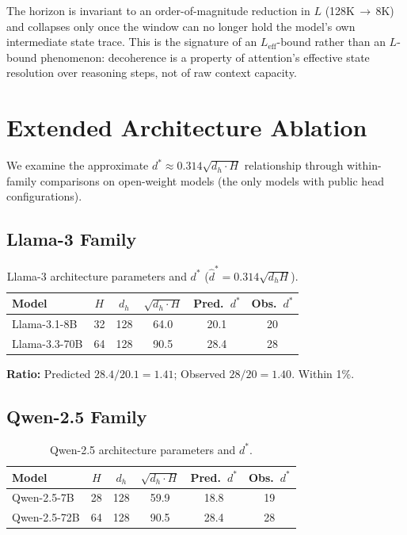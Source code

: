 \documentclass{article}
\theoremstyle{plain}
\theoremstyle{definition}
\theoremstyle{remark}
\newcommand{\Leff}{L_{\mathrm{eff}}}
\begin{document}
The horizon is invariant to an order-of-magnitude reduction in $L$ (128K\,$\to$\,8K) and collapses only once the window can no longer hold the model's own intermediate state trace. This is the signature of an $\Leff$-bound rather than an $L$-bound phenomenon: decoherence is a property of attention's effective state resolution over reasoning steps, not of raw context capacity.


\section{Extended Architecture Ablation}
\label{app:arch_ablation}

We examine the approximate $d^* \approx 0.314\sqrt{d_h \cdot H}$ relationship through within-family comparisons on open-weight models (the only models with public head configurations).

\subsection{Llama-3 Family}

\begin{table}[h]
\centering
\caption{Llama-3 architecture parameters and $d^*$ ($\hat{d}^* = 0.314\sqrt{d_h H}$).}
\label{tab:llama_arch}
\small
\begin{tabular}{@{}lccccc@{}}
\toprule
\textbf{Model} & $H$ & $d_h$ & $\sqrt{d_h \cdot H}$ & \textbf{Pred.\ $d^*$} & \textbf{Obs.\ $d^*$} \\
\midrule
Llama-3.1-8B & 32 & 128 & 64.0 & 20.1 & 20 \\
Llama-3.3-70B & 64 & 128 & 90.5 & 28.4 & 28 \\
\bottomrule
\end{tabular}
\end{table}

\textbf{Ratio:} Predicted $28.4/20.1 = 1.41$; Observed $28/20 = 1.40$. Within 1\%.

\subsection{Qwen-2.5 Family}

\begin{table}[h]
\centering
\caption{Qwen-2.5 architecture parameters and $d^*$.}
\label{tab:qwen_arch}
\small
\begin{tabular}{@{}lccccc@{}}
\toprule
\textbf{Model} & $H$ & $d_h$ & $\sqrt{d_h \cdot H}$ & \textbf{Pred.\ $d^*$} & \textbf{Obs.\ $d^*$} \\
\midrule
Qwen-2.5-7B & 28 & 128 & 59.9 & 18.8 & 19 \\
Qwen-2.5-72B & 64 & 128 & 90.5 & 28.4 & 28 \\
\bottomrule
\end{tabular}
\end{table}
\end{document}
